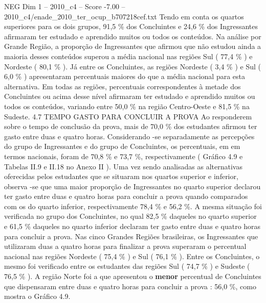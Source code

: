 \begin{textsample}{NEG Dim 1 – 2010\_c4 – Score -7.00 – 2010\_c4/enade\_2010\_ter\_ocup\_b707218cef.txt}
Tendo em conta os quartos superiores para os dois grupos, 91,5 \% dos Concluintes e 24,6 \% dos Ingressantes afirmaram ter estudado e aprendido muitos ou todos os conteúdos.
Na análise por Grande Região, a proporção de Ingressantes que afirmou que não estudou ainda a maioria desses conteúdos superou a média nacional nas regiões Sul ( 77,4 \% ) e Nordeste ( 80,1 \% ).
Já entre os Concluintes, as regiões Nordeste ( 3,4 \% ) e Sul ( 6,0 \% ) apresentaram percentuais maiores do que a média nacional para esta alternativa.
Em todas as regiões, percentuais correspondentes à metade dos Concluintes ou acima desse nível afirmaram ter estudado e aprendido muitos ou todos os conteúdos, variando entre 50,0 \% na região Centro-Oeste e 81,5 \% na Sudeste. 4.7 TEMPO GASTO PARA CONCLUIR A PROVA Ao responderem sobre o tempo de conclusão da prova, mais de 70,0 \% dos estudantes afirmou ter gasto entre duas e quatro horas.
Considerando -se separadamente as percepções do grupo de Ingressantes e do grupo de Concluintes, os percentuais, em em termos nacionais, foram de 70,8 \% e 73,7 \%, respectivamente ( Gráfico 4.9 e Tabelas II.9 e II.18 no Anexo II ).
Uma vez sendo analisadas as alternativas oferecidas pelos estudantes que se situaram nos quartos superior e inferior, observa -se que uma maior proporção de Ingressantes no quarto superior declarou ter gasto entre duas e quatro horas para concluir a prova quando comparados com os do quarto inferior, respectivamente 78,4 \% e 56,2 \%.
A mesma situação foi verificada no grupo dos Concluintes, no qual 82,5 \% daqueles no quarto superior e 61,5 \% daqueles no quarto inferior declaram ter gasto entre duas e quatro horas para concluir a prova.
Nas cinco Grandes Regiões brasileiras, os Ingressantes que utilizaram duas a quatro horas para finalizar a prova superaram o percentual nacional nas regiões Nordeste ( 75,4 \% ) e Sul ( 76,1 \% ).
Entre os Concluintes, o mesmo foi verificado entre os estudantes das regiões Sul ( 74,7 \% ) e Sudeste ( 76,5 \% ).
A região Norte foi a que apresentou o \textbf{menor} percentual de Concluintes que dispensaram entre duas e quatro horas para concluir a prova : 56,0 \%, como mostra o Gráfico 4.9.

\end{textsample}
